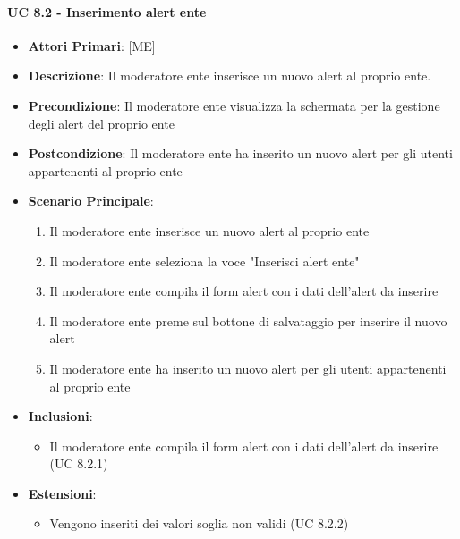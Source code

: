 			\paragraph{UC 8.2 - Inserimento alert ente}
			\begin{itemize}
				\item \textbf{Attori Primari}: [ME]
				\item \textbf{Descrizione}: Il moderatore ente inserisce un nuovo alert al proprio ente.
				\item \textbf{Precondizione}: Il moderatore ente visualizza la schermata per la gestione degli alert del proprio ente
				\item \textbf{Postcondizione}: Il moderatore ente ha inserito un nuovo alert per gli utenti appartenenti al proprio ente 
				\item \textbf{Scenario Principale}:
				\begin{enumerate}
					\item{Il moderatore ente inserisce un nuovo alert al proprio ente}
					\item{Il moderatore ente seleziona la voce "Inserisci alert ente"}
					\item{Il moderatore ente compila il form alert con i dati dell'alert da inserire}
					\item{Il moderatore ente preme sul bottone di salvataggio per inserire il nuovo alert}
					\item{Il moderatore ente ha inserito un nuovo alert per gli utenti appartenenti al proprio ente }
				\end{enumerate}
				\item \textbf{Inclusioni}:
				\begin{itemize}
					\item Il moderatore ente compila il form alert con i dati dell'alert da inserire (UC 8.2.1)
				\end{itemize}
				\item \textbf{Estensioni}:
				\begin{itemize}
					\item Vengono inseriti dei valori soglia non validi (UC 8.2.2)
				\end{itemize}		
			\end{itemize}
			
